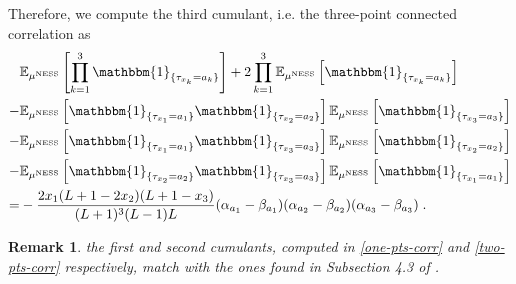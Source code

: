 \documentclass[10pt]{article}
\numberwithin{equation}{section}
\numberwithin{equation}{subsection}
\newtheorem{remark}{Remark}
\newcommand{\dt}{\;.}
\begin{document}
Therefore, we compute the third cumulant, i.e. the three-point connected correlation as 
\begin{align}
	&\mathbb{E}_{\mu^{\text{NESS}}}\left[\prod_{k=1}^{3}\mathbbm{1}_{\{\tau_{x_{k}}=a_{k}\}}\right]+2\prod_{k=1}^{3}\mathbb{E}_{\mu^{\text{NESS}}}\left[\mathbbm{1}_{\{\tau_{x_{k}}=a_{k}\}}\right]\nonumber\\-&\mathbb{E}_{\mu^{\text{NESS}}}\left[\mathbbm{1}_{\{\tau_{x_{1}}=a_{1}\}}\mathbbm{1}_{\{\tau_{x_{2}}=a_{2}\}}\right]\mathbb{E}_{\mu^{\text{NESS}}}\left[\mathbbm{1}_{\{\tau_{x_{3}}=a_{3}\}}\right]\nonumber\\
	-&\mathbb{E}_{\mu^{\text{NESS}}}\left[\mathbbm{1}_{\{\tau_{x_{1}}=a_{1}\}}\mathbbm{1}_{\{\tau_{x_{3}}=a_{3}\}}\right]\mathbb{E}_{\mu^{\text{NESS}}}\left[\mathbbm{1}_{\{\tau_{x_{2}}=a_{2}\}}\right]\nonumber\\
	-&\mathbb{E}_{\mu^{\text{NESS}}}\left[\mathbbm{1}_{\{\tau_{x_{2}}=a_{2}\}}\mathbbm{1}_{\{\tau_{x_{3}}=a_{3}\}}\right]\mathbb{E}_{\mu^{\text{NESS}}}\left[\mathbbm{1}_{\{\tau_{x_{1}}=a_{1}\}}\right]\nonumber
	\\
	=&-\frac{2x_{1}(L+1-2x_{2})(L+1-x_{3})}{(L+1)^{3}(L-1)L}(\alpha_{a_{1}}-\beta_{a_{1}})(\alpha_{a_{2}}-\beta_{a_{2}})(\alpha_{a_{3}}-\beta_{a_{3}})\dt
\end{align}
\begin{remark} the first and second cumulants, computed in \eqref{one-pts-corr} and \eqref{two-pts-corr} respectively, match with the ones found in Subsection 4.3 of \cite{vanicat2017exact}.
	\end{remark}
\end{document}

